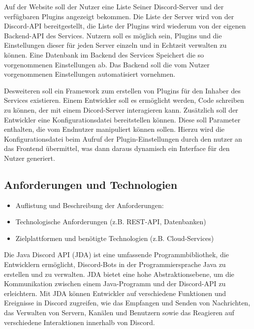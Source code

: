 Auf der Website soll der Nutzer eine Liste Seiner Discord-Server und der verfügbaren Plugins angezeigt bekommen. Die Liste der Server wird von der Discord-API bereitgestellt, die Liste der Plugins wird wiederum von der eigenen Backend-API des Services. Nutzern soll es möglich sein, Plugins und die Einstellungen dieser für jeden Server einzeln und in Echtzeit verwalten zu können. Eine Datenbank im Backend des Services Speichert die so vorgenommenen Einstellungen ab. Das Backend soll die vom Nutzer vorgenommenen Einstellungen automatisiert vornehmen. 

Desweiteren soll ein Framework zum erstellen von Plugins für den Inhaber des Services existieren. Einem Entwickler soll es ermöglicht werden, Code schreiben zu können, der mit einem Dicord-Server interagieren kann. Zusätzlich soll der Entwickler eine Konfigurationsdatei bereitstellen können. Diese soll Parameter enthalten, die vom Endnutzer manipuliert können sollen. Hierzu wird die Konfigurationsdatei beim Aufruf der Plugin-Einstellungen durch den nutzer an das Frontend übermittel, was dann daraus dynamisch ein Interface für den Nutzer generiert.

\subsection{Anforderungen und Technologien}\label{anforderungen-und-technologien}

\begin{itemize}
  \item
        Auflistung und Beschreibung der Anforderungen:
  \item
        Technologische Anforderungen (z.B. REST-API, Datenbanken)
  \item
        Zielplattformen und benötigte Technologien (z.B. Cloud-Services)
\end{itemize}

Die Java Discord API (JDA) ist eine umfassende Programmbibliothek, die Entwicklern ermöglicht, Discord-Bots in der Programmiersprache Java zu erstellen und zu verwalten. JDA bietet eine hohe Abstraktionsebene, um die Kommunikation zwischen einem Java-Programm und der Discord-API zu erleichtern. Mit JDA können Entwickler auf verschiedene Funktionen und Ereignisse in Discord zugreifen, wie das Empfangen und Senden von Nachrichten, das Verwalten von Servern, Kanälen und Benutzern sowie das Reagieren auf verschiedene Interaktionen innerhalb von Discord.
        
